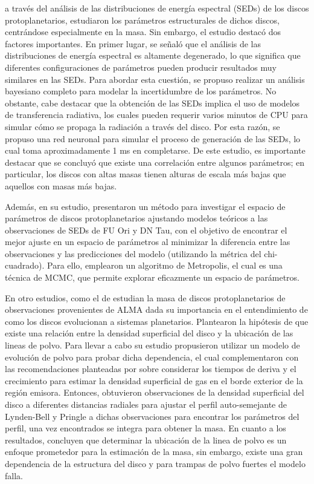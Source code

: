  \cite{Kaeufer_Woitke_Min_Kamp_Pinte_2023} a través del análisis de las distribuciones de energía espectral (SEDs) de los discos protoplanetarios, estudiaron los parámetros estructurales de dichos discos, centrándose especialmente en la masa. Sin embargo, el estudio destacó dos factores importantes. En primer lugar, se señaló que el análisis de las distribuciones de energía espectral es altamente degenerado, lo que significa que diferentes configuraciones de parámetros pueden producir resultados muy similares en las SEDs. Para abordar esta cuestión, se propuso realizar un análisis bayesiano completo para modelar la incertidumbre de los parámetros. No obstante, cabe destacar que la obtención de las SEDs implica el uso de modelos de transferencia radiativa, los cuales pueden requerir varios minutos de CPU para simular cómo se propaga la radiación a través del disco. Por esta razón, se propuso una red neuronal para simular el proceso de generación de las SEDs, lo cual toma aproximadamente 1 ms en completarse. De este estudio, es importante destacar que se concluyó que existe una correlación entre algunos parámetros; en particular, los discos con altas masas tienen alturas de escala más bajas que aquellos con masas más bajas.

 Además, en su estudio, \cite{1994A&A...287..493T} presentaron un método para investigar el espacio de parámetros de discos protoplanetarios ajustando modelos teóricos a las observaciones de SEDs de FU Ori y DN Tau, con el objetivo de encontrar el mejor ajuste en un espacio de parámetros al minimizar la diferencia entre las observaciones y las predicciones del modelo (utilizando la métrica del chi-cuadrado). Para ello, emplearon un algoritmo de Metropolis, el cual es una técnica de MCMC, que permite explorar eficazmente un espacio de parámetros.

 En otro estudios, como el de \cite{Franceschi_Birnstiel_Henning_Pinilla_Semenov_Zormpas_2022} estudian la masa de discos protoplanetarios de observaciones provenientes de ALMA dada su importancia en el entendimiento de como los discos evolucionan a sistemas planetarios. Plantearon la hipótesis de que existe una relación entre la densidad superficial del disco y la ubicación de las lineas de polvo. Para llevar a cabo su estudio propusieron utilizar un modelo de evolución de polvo para probar dicha dependencia, el cual complementaron con las recomendaciones planteadas por \cite{2017ApJ...840...93P} sobre considerar los tiempos de deriva y el crecimiento para estimar la densidad superficial de gas en el borde exterior de la región emisora. Entonces, obtuvieron observaciones de la densidad superficial del disco a diferentes distancias radiales para ajustar el perfil auto-semejante de Lynden-Bell y Pringle a dichas observaciones para encontrar los parámetros del perfil, una vez encontrados se integra para obtener la masa. En cuanto a los resultados, concluyen que determinar la ubicación de la linea de polvo es un enfoque prometedor para la estimación de la masa, sin embargo, existe una gran dependencia de la estructura del disco y para trampas de polvo fuertes el modelo falla.

